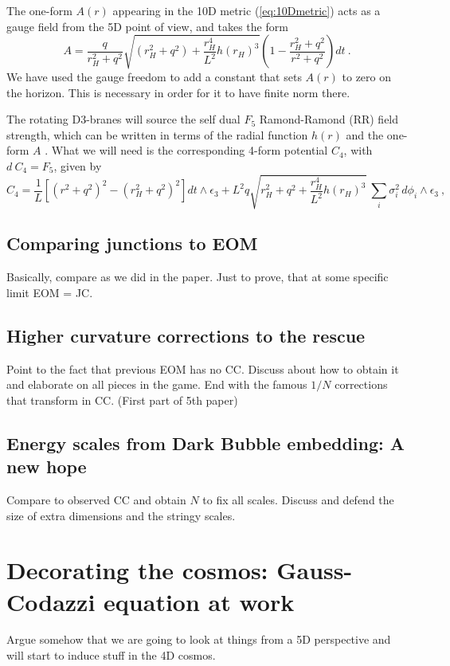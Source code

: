 \documentclass[12pt, a4paper]{article} %
\begin{document}
The one-form $A(r)$ appearing in the 10D metric (\ref{eq:10Dmetric}) acts as a gauge field from the 5D point of view, and takes the form
\begin{equation}\label{eq:gaugepots}
 A = \frac{q}{r_H^2+q^2}\sqrt{ (r_H^2 + q^2) + \frac{r_H^4}{L^2} h(r_H)^3} \left(1-\frac{r_H^2+q^2}{r^2+q^2}\right) dt \ .
\end{equation}
We have used the gauge freedom to add a constant that sets $A(r)$ to zero on the horizon. This is necessary in order for it to have finite norm there.

The rotating D3-branes will source the self dual $F_{5}$ Ramond-Ramond (RR) field strength, which can be written in terms of the radial function $h(r)$ and the one-form $A$ \cite{Henriksson:2019zph}. What we will need is the corresponding 4-form potential $C_{4}$, with $d\:C_{4}=F_{5}$, given by
\begin{equation}
C_4 = \frac{1}{L}\left[(r^2+q^2)^2 - (r_H^2+q^2)^2\right] dt \wedge \epsilon_3 + L^2 q \sqrt{ r_H^2 + q^2 + \frac{r_H^4}{L^2} h(r_H)^3}\ \sum_i \sigma_i^2\, d\phi_i \wedge \epsilon_3 \ , \label{eq:C4}
\end{equation}
\subsection{Comparing junctions to EOM}
Basically, compare as we did in the paper. Just to prove, that at some specific limit EOM = JC. 
\subsection{Higher curvature corrections to the rescue}
Point to the fact that previous EOM has no CC. Discuss about how to obtain it and elaborate on all pieces in the game. End with the famous $1/N$ corrections that transform in CC. (First part of 5th paper)
\subsection{Energy scales from Dark Bubble embedding: A new hope}\label{subsec: energy_scale}
Compare to observed CC and obtain $N$ to fix all scales. Discuss and defend the size of extra dimensions and the stringy scales.
\section{Decorating the cosmos: Gauss-Codazzi equation at work}\label{sec: decoration}
Argue somehow that we are going to look at things from a 5D perspective and will start to induce stuff in the 4D cosmos.
\end{document}
